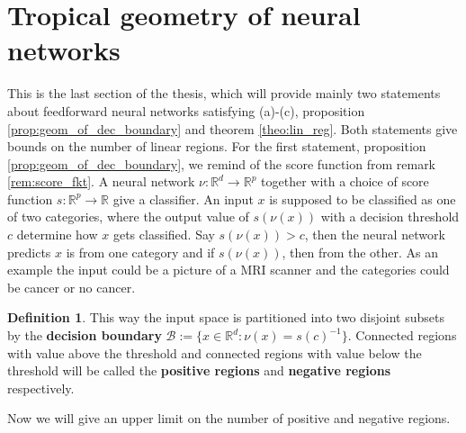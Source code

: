 \documentclass{article}
\theoremstyle{definition}
\newtheorem{definition}[theorem]{Definition}
\begin{document}
\newpage

\section{Tropical geometry of neural networks}
\label{sec:tropical_geometry_of_neural_networks}

This is the last section of the thesis, which will provide mainly two statements about feedforward neural networks satisfying (a)-(c), proposition \ref{prop:geom_of_dec_boundary} and theorem \ref{theo:lin_reg}. Both statements give bounds on the number of linear regions. For the first statement, proposition \ref{prop:geom_of_dec_boundary}, we remind of the score function from remark \ref{rem:score_fkt}. A neural network $\nu : \mathbb{R}^{d} \to \mathbb{R}^{p}$ together with a choice of score function $s : \mathbb{R}^{p} \to \mathbb{R}$ give a classifier. An input $x$ is supposed to be classified as one of two categories, where the output value of $s(\nu(x))$ with a decision threshold $c$ determine how $x$ gets classified. Say $s(\nu(x))>c$, then the neural network predicts $x$ is from one category and if $s(\nu(x))$, then from the other. As an example the input could be a picture of a MRI scanner and the categories could be cancer or no cancer.

\begin{definition}\hspace{1sp}\cite{zhang2018tropical}
This way the input space is partitioned into two disjoint subsets by the
\textbf{decision boundary} $\mathcal{B} := \{ x \in \mathbb{R}^{d}: \nu(x)=s(c)^{-1} \}$. Connected regions with value above the threshold and connected
regions with value below the threshold will be called the
\textbf{positive regions} and \textbf{negative regions} respectively.
\end{definition}

Now we will give an upper limit on the number of positive and negative regions.
\end{document}
